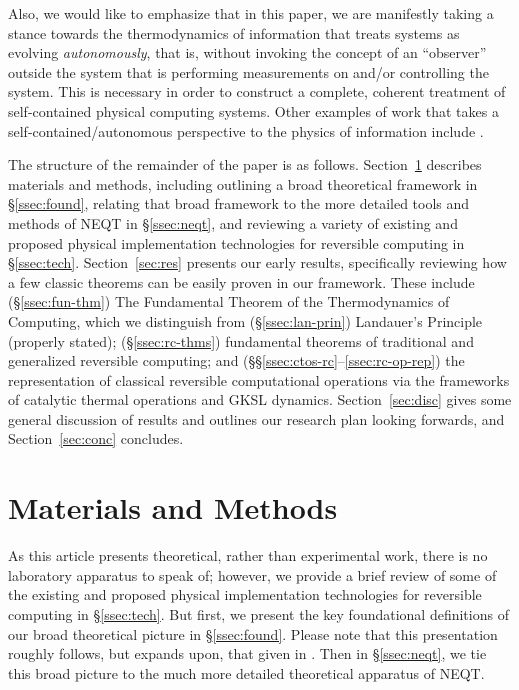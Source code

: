 \documentclass[preprints,article,accept,moreauthors,pdftex]{Definitions/mdpi}
\begin{document}
Also, we would like to emphasize that in this paper, we are manifestly taking a stance towards the thermodynamics of information that treats systems as evolving \textit{autonomously}, that is, without invoking the concept of an ``observer'' outside the system that is performing measurements on and/or controlling the system. This is necessary in order to construct a complete, coherent treatment of self-contained physical computing systems. Other examples of work that takes a self-contained/autonomous perspective to the physics of information include \cite{DJ13,BS14,SSBE17}.

The structure of the remainder of the paper is as follows. Section~\ref{sec:mat-meth} describes materials and methods, including outlining a broad theoretical framework in \S\ref{ssec:found}, relating that broad framework to the more detailed tools and methods of NEQT in \S\ref{ssec:neqt}, and reviewing a variety of existing and proposed physical implementation technologies for reversible computing in \S\ref{ssec:tech}. Section~\ref{sec:res} presents our early results, specifically reviewing how a few classic theorems can be easily proven in our framework. These include (\S\ref{ssec:fun-thm}) The Fundamental Theorem of the Thermodynamics of Computing, which we distinguish from (\S\ref{ssec:lan-prin}) Landauer's Principle (properly stated); (\S\ref{ssec:rc-thms}) fundamental theorems of traditional and generalized reversible computing; and  (\S\S\ref{ssec:ctos-rc}--\ref{ssec:rc-op-rep}) the representation of classical reversible computational operations via the frameworks of catalytic thermal operations and GKSL dynamics. Section~\ref{sec:disc} gives some general discussion of results and outlines our research plan looking forwards, and Section~\ref{sec:conc} concludes.

\section{Materials and Methods}
\label{sec:mat-meth}

As this article presents theoretical, rather than experimental work, there is no laboratory apparatus to speak of; however, we provide a brief review of some of the existing and proposed physical implementation technologies for reversible computing in \S\ref{ssec:tech}. But first, we present the key foundational definitions of our broad theoretical picture in \S\ref{ssec:found}. Please note that this presentation roughly follows, but expands upon, that given in \cite{Fra18,Fra17a}. Then in \S\ref{ssec:neqt}, we tie this broad picture to the much more detailed theoretical apparatus of NEQT.
\end{document}
